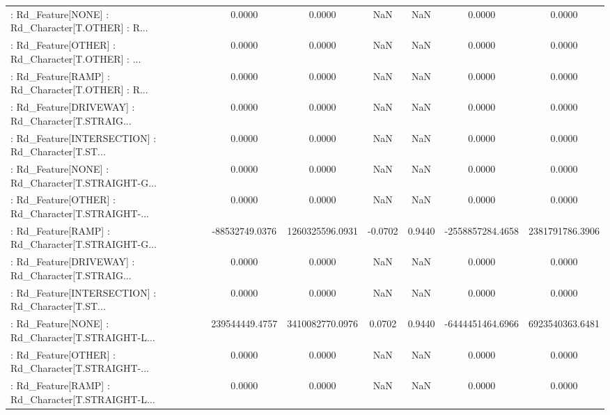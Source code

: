 \begin{longtable}{p{4cm}cccccc}
 : Rd\_Feature[NONE] : Rd\_Character[T.OTHER] : R... &            0.0000 &            0.0000 &     NaN &          NaN &             0.0000 &            0.0000 \\
 : Rd\_Feature[OTHER] : Rd\_Character[T.OTHER] : ... &            0.0000 &            0.0000 &     NaN &          NaN &             0.0000 &            0.0000 \\
 : Rd\_Feature[RAMP] : Rd\_Character[T.OTHER] : R... &            0.0000 &            0.0000 &     NaN &          NaN &             0.0000 &            0.0000 \\
 : Rd\_Feature[DRIVEWAY] : Rd\_Character[T.STRAIG... &            0.0000 &            0.0000 &     NaN &          NaN &             0.0000 &            0.0000 \\
 : Rd\_Feature[INTERSECTION] : Rd\_Character[T.ST... &            0.0000 &            0.0000 &     NaN &          NaN &             0.0000 &            0.0000 \\
 : Rd\_Feature[NONE] : Rd\_Character[T.STRAIGHT-G... &            0.0000 &            0.0000 &     NaN &          NaN &             0.0000 &            0.0000 \\
 : Rd\_Feature[OTHER] : Rd\_Character[T.STRAIGHT-... &            0.0000 &            0.0000 &     NaN &          NaN &             0.0000 &            0.0000 \\
 : Rd\_Feature[RAMP] : Rd\_Character[T.STRAIGHT-G... &    -88532749.0376 &   1260325596.0931 & -0.0702 &       0.9440 &   -2558857284.4658 &   2381791786.3906 \\
 : Rd\_Feature[DRIVEWAY] : Rd\_Character[T.STRAIG... &            0.0000 &            0.0000 &     NaN &          NaN &             0.0000 &            0.0000 \\
 : Rd\_Feature[INTERSECTION] : Rd\_Character[T.ST... &            0.0000 &            0.0000 &     NaN &          NaN &             0.0000 &            0.0000 \\
 : Rd\_Feature[NONE] : Rd\_Character[T.STRAIGHT-L... &    239544449.4757 &   3410082770.0976 &  0.0702 &       0.9440 &   -6444451464.6966 &   6923540363.6481 \\
 : Rd\_Feature[OTHER] : Rd\_Character[T.STRAIGHT-... &            0.0000 &            0.0000 &     NaN &          NaN &             0.0000 &            0.0000 \\
 : Rd\_Feature[RAMP] : Rd\_Character[T.STRAIGHT-L... &            0.0000 &            0.0000 &     NaN &          NaN &             0.0000 &            0.0000 \\

\end{longtable}
